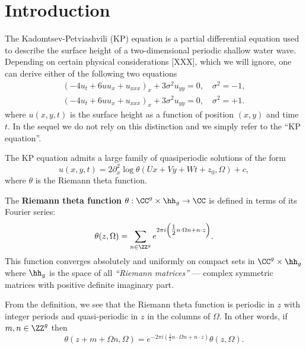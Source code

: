 \section{Introduction}

The Kadomtsev-Petviashvili (KP) equation is a partial differential
equation used to describe the surface height of a two-dimensional
periodic shallow water wave. Depending on certain physical
considerations [XXX], which we will ignore, one can derive either of the
following two equations
\begin{align}
  \left(-4u_t + 6uu_x + u_{xxx}\right)_x + 3\sigma^2 u_{yy} = 0, \quad
  \sigma^2 = -1, \label{eqn: KP1} \\
  \left(-4u_t + 6uu_x + u_{xxx}\right)_x + 3\sigma^2 u_{yy} = 0, \quad
  \sigma^2 = +1. \label{eqn: KP2}
\end{align}
where $u(x,y,t)$ is the surface height as a function of position $(x,y)$
and time $t$. In the sequel we do not rely on this distinction and we
simply refer to the ``KP equation''.

The KP equation admits a large family of quasiperiodic solutions of the
form
\begin{equation} \label{eqn: kpsol}
  u(x,y,t) = 2 \partial_x^2 \log \theta(Ux+Vy+Wt+z_0, \Omega) + c,
\end{equation}
where $\theta$ is the Riemann theta function.

\begin{definition} \label{def: riemanntheta}
  The {\bf Riemann theta function} $\theta: \CC^g \times \hh_g \to \CC$
  is defined in terms of its Fourier series:
  \begin{equation} \label{eqn: riemanntheta}
    \theta(z,\Omega) = \sum_{n \in \ZZ^g}
    e^{2 \pi i \left( \tfrac{1}{2} n \cdot \Omega n + n \cdot z \right)}.
  \end{equation}
  This function converges absolutely and uniformly on compact sets in
  $\CC^g \times \hh_g$ where $\hh_g$ is the space of all {\it ``Riemann
    matrices''} --- complex symmetric matrices with positive definite
  imaginary part.
\end{definition}

From the definition, we see that the Riemann theta function is periodic
in $z$ with integer periods and quasi-periodic in $z$ in the columns of
$\Omega$. In other words, if $m,n \in \ZZ^g$ then
\begin{equation} \label{eq: quasiperiodicity}
    \theta(z + m + \Omega n, \Omega) =
    e^{-2 \pi i \left( \tfrac{1}{2} n \cdot \Omega n + n \cdot z \right) }
    \theta(z, \Omega).
\end{equation}

